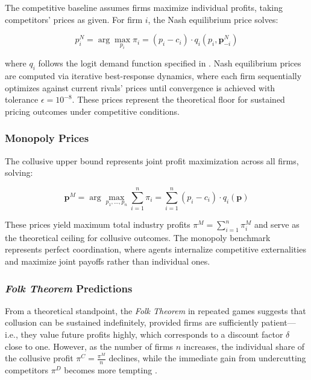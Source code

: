 The competitive baseline assumes firms maximize individual profits, taking competitors' prices as given. For firm $i$, the Nash equilibrium price solves:

\begin{equation}\label{eq:nash}
    p_i^{N} = \arg\max_{p_i} \pi_i = (p_i - c_i) \cdot q_i(p_i, \mathbf{p}_{-i}^N)
\end{equation}

where $q_i$ follows the logit demand function specified in . Nash equilibrium prices are computed via iterative best-response dynamics, where each firm sequentially optimizes against current rivals' prices until convergence is achieved with tolerance $\epsilon = 10^{-8}$. These prices represent the theoretical floor for sustained pricing outcomes under competitive conditions.

\subsubsection*{Monopoly Prices}

The collusive upper bound represents joint profit maximization across all firms, solving:

\begin{equation}\label{eq:monop}
    \mathbf{p}^M = \arg\max_{p_1,...,p_n} \sum_{i=1}^n \pi_i = \sum_{i=1}^n (p_i - c_i) \cdot q_i(\mathbf{p})
\end{equation}

These prices yield maximum total industry profits $\pi^M = \sum_{i=1}^n \pi_i^M$ and serve as the theoretical ceiling for collusive outcomes. The monopoly benchmark represents perfect coordination, where agents internalize competitive externalities and maximize joint payoffs rather than individual ones.

\subsubsection*{\emph{Folk Theorem} Predictions}

From a theoretical standpoint, the \emph{Folk Theorem} in repeated games suggests that collusion can be sustained indefinitely, provided firms are sufficiently patient---i.e., they value future profits highly, which corresponds to a discount factor $\delta$ close to one. However, as the number of firms $n$ increases, the individual share of the collusive profit $\pi^C = \frac{\pi^M}{n}$ declines, while the immediate gain from undercutting competitors $\pi^D$ becomes more tempting \parencite{ivaldi_chapter_2007, tirole_theory_1988}.

